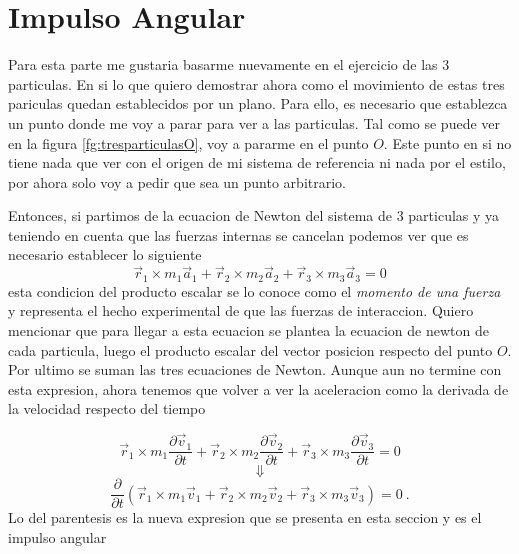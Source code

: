\documentclass[../Main.tex]{subfiles}
\begin{document}
{
        \section{Impulso Angular}


        Para esta parte me gustaria basarme nuevamente en el ejercicio de las 3
        particulas. En si lo que quiero demostrar ahora como el movimiento de estas
        tres pariculas quedan establecidos por un plano. Para ello, es necesario que
        establezca un punto donde me voy a parar para ver a las particulas. Tal como
        se puede ver en la figura \ref{fg:tresparticulasO}, voy a pararme en el punto
        $O$. Este punto en si no tiene nada que ver con el origen de mi sistema de 
        referencia ni nada por el estilo, por ahora solo voy a pedir que sea un punto
        arbitrario.

        Entonces, si partimos de la ecuacion de Newton del sistema de 3 particulas y ya
        teniendo en cuenta que las fuerzas internas se cancelan podemos ver que es 
        necesario establecer lo siguiente
        \begin{equation*}
            \vec{r}_1 \times m_1 \vec{a}_1 + \vec{r}_2 \times m_2 \vec{a}_2 + \vec{r}_3 \times m_3 \vec{a}_3 = 0
        \end{equation*}
        esta condicion del producto escalar se lo conoce como el \textit{momento de una fuerza}
        y representa el hecho experimental de que las fuerzas de interaccion. Quiero
        mencionar que para llegar a esta ecuacion se plantea la ecuacion de newton de
        cada particula, luego el producto escalar del vector posicion respecto del
        punto $O$. Por ultimo se suman las tres ecuaciones de Newton. Aunque aun no
        termine con esta expresion, ahora tenemos que volver a ver la aceleracion como
        la derivada de la velocidad respecto del tiempo

        \begin{equation*}
            \vec{r}_1 \times m_1 \frac{\partial \vec{v} _1}{\partial t} + \vec{r}_2 \times m_2 \frac{\partial \vec{v} _2}{\partial t} + \vec{r}_3 \times m_3 \frac{\partial \vec{v} _3}{\partial t} = 0
        \end{equation*}
        \begin{equation*}
            \Downarrow
        \end{equation*}
        \begin{equation}
            \frac{\partial}{\partial t} \left( \vec{r}_1 \times m_1 \vec{v} _1 + \vec{r}_2 \times m_2 \vec{v} _2 + \vec{r}_3 \times m_3 \vec{v} _3 \right) = 0 \ .
            \label{eq:partialL}
        \end{equation}
        Lo del parentesis es la nueva expresion que se presenta en esta seccion y es
        el impulso angular

}
\end{document}
